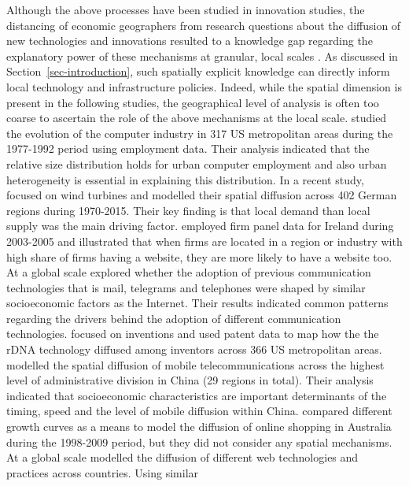 \documentclass[
  authoryear,
  preprint,
  3p]{elsarticle}
\begin{document}
Although the above processes have been studied in innovation studies,
the distancing of economic geographers from research questions about the
diffusion of new technologies and innovations resulted to a knowledge
gap regarding the explanatory power of these mechanisms at granular,
local scales \citep{ding2010modeling}. As discussed in
Section~\ref{sec-introduction}, such spatially explicit knowledge can
directly inform local technology and infrastructure policies. Indeed,
while the spatial dimension is present in the following studies, the
geographical level of analysis is often too coarse to ascertain the role
of the above mechanisms at the local scale. \citet{beardsell1999spatial}
studied the evolution of the computer industry in 317 US metropolitan
areas during the 1977-1992 period using employment data. Their analysis
indicated that the relative size distribution holds for urban computer
employment and also urban heterogeneity is essential in explaining this
distribution. In a recent study, \citet{bednarz2020pulled} focused on
wind turbines and modelled their spatial diffusion across 402 German
regions during 1970-2015. Their key finding is that local demand than
local supply was the main driving factor. \citet{haller2011determinants}
employed firm panel data for Ireland during 2003-2005 and illustrated
that when firms are located in a region or industry with high share of
firms having a website, they are more likely to have a website too. At a
global scale \citet{perkins2011internet} explored whether the adoption
of previous communication technologies that is mail, telegrams and
telephones were shaped by similar socioeconomic factors as the Internet.
Their results indicated common patterns regarding the drivers behind the
adoption of different communication technologies.
\citet{feldman2015rknowledge} focused on inventions and used patent data
to map how the the rDNA technology diffused among inventors across 366
US metropolitan areas. \citet{ding2010modeling} modelled the spatial
diffusion of mobile telecommunications across the highest level of
administrative division in China (29 regions in total). Their analysis
indicated that socioeconomic characteristics are important determinants
of the timing, speed and the level of mobile diffusion within China.
\citet{bakher2013diffusion} compared different growth curves as a means
to model the diffusion of online shopping in Australia during the
1998-2009 period, but they did not consider any spatial mechanisms. At a
global scale \citet{PAPAGIANNIDIS2015308} modelled the diffusion of
different web technologies and practices across countries. Using similar
\end{document}
